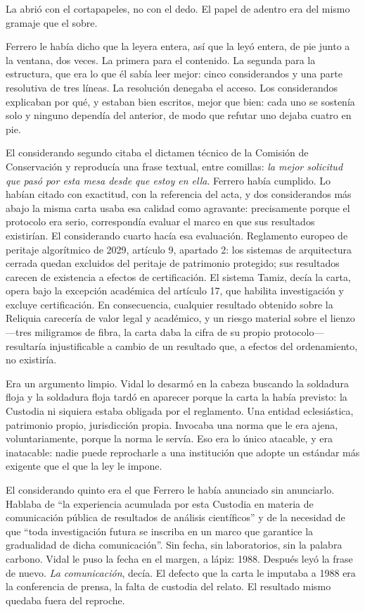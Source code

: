La abrió con el cortapapeles, no con el dedo. El papel de adentro era del mismo gramaje que el sobre.

Ferrero le había dicho que la leyera entera, así que la leyó entera, de pie junto a la ventana, dos veces. La primera para el contenido. La segunda para la estructura, que era lo que él sabía leer mejor: cinco considerandos y una parte resolutiva de tres líneas. La resolución denegaba el acceso. Los considerandos explicaban por qué, y estaban bien escritos, mejor que bien: cada uno se sostenía solo y ninguno dependía del anterior, de modo que refutar uno dejaba cuatro en pie.

El considerando segundo citaba el dictamen técnico de la Comisión de Conservación y reproducía una frase textual, entre comillas: \textit{la mejor solicitud que pasó por esta mesa desde que estoy en ella}. Ferrero había cumplido. Lo habían citado con exactitud, con la referencia del acta, y dos considerandos más abajo la misma carta usaba esa calidad como agravante: precisamente porque el protocolo era serio, correspondía evaluar el marco en que sus resultados existirían. El considerando cuarto hacía esa evaluación. Reglamento europeo de peritaje algorítmico de 2029, artículo 9, apartado 2: los sistemas de arquitectura cerrada quedan excluidos del peritaje de patrimonio protegido; sus resultados carecen de existencia a efectos de certificación. El sistema Tamiz, decía la carta, opera bajo la excepción académica del artículo 17, que habilita investigación y excluye certificación. En consecuencia, cualquier resultado obtenido sobre la Reliquia carecería de valor legal y académico, y un riesgo material sobre el lienzo ---tres miligramos de fibra, la carta daba la cifra de su propio protocolo--- resultaría injustificable a cambio de un resultado que, a efectos del ordenamiento, no existiría.

Era un argumento limpio. Vidal lo desarmó en la cabeza buscando la soldadura floja y la soldadura floja tardó en aparecer porque la carta la había previsto: la Custodia ni siquiera estaba obligada por el reglamento. Una entidad eclesiástica, patrimonio propio, jurisdicción propia. Invocaba una norma que le era ajena, voluntariamente, porque la norma le servía. Eso era lo único atacable, y era inatacable: nadie puede reprocharle a una institución que adopte un estándar más exigente que el que la ley le impone.

El considerando quinto era el que Ferrero le había anunciado sin anunciarlo. Hablaba de ``la experiencia acumulada por esta Custodia en materia de comunicación pública de resultados de análisis científicos'' y de la necesidad de que ``toda investigación futura se inscriba en un marco que garantice la gradualidad de dicha comunicación''. Sin fecha, sin laboratorios, sin la palabra carbono. Vidal le puso la fecha en el margen, a lápiz: 1988. Después leyó la frase de nuevo. \textit{La comunicación}, decía. El defecto que la carta le imputaba a 1988 era la conferencia de prensa, la falta de custodia del relato. El resultado mismo quedaba fuera del reproche.

